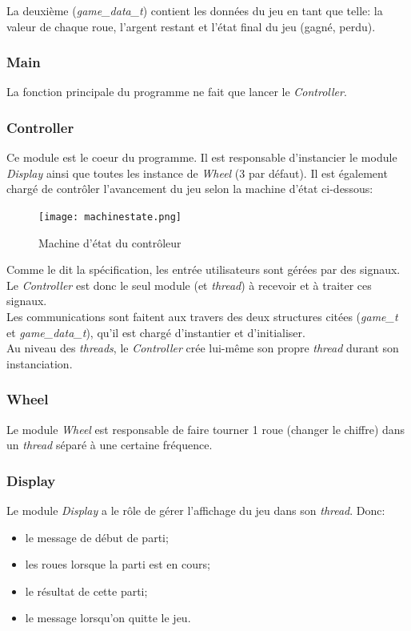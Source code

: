 \documentclass[11pt, a4paper]{article}
\begin{document}
La deuxième (\textit{game\_data\_t}) contient les données du jeu en tant que telle:
la valeur de chaque roue, l'argent restant et l'état final du jeu (gagné, perdu).

\subsubsection{Main}
La fonction principale du programme ne fait que lancer le \textit{Controller}.

\newpage

\subsubsection{Controller}
Ce module est le coeur du programme.
Il est responsable d'instancier le module \textit{Display} ainsi que toutes les instance de \textit{Wheel} (3 par défaut).
Il est également chargé de contrôler l'avancement du jeu selon la machine d'état ci-dessous:

\begin{figure}[H]
    \begin{center}
        \texttt{[image: machinestate.png]}
    \end{center}
    \caption{Machine d'état du contrôleur}
    \label{Machine d'état du contrôleur}
\end{figure}

Comme le dit la spécification, les entrée utilisateurs sont gérées par des signaux.
Le \textit{Controller} est donc le seul module (et \textit{thread}) à recevoir et à traiter ces signaux. \\

Les communications sont faitent aux travers des deux structures citées (\textit{game\_t} et \textit{game\_data\_t}),
qu'il est chargé d'instantier et d'initialiser. \\

Au niveau des \textit{threads}, le \textit{Controller} crée lui-même son propre \textit{thread} durant son instanciation.

\subsubsection{Wheel}
Le module \textit{Wheel} est responsable de faire tourner 1 roue (changer le chiffre) dans un \textit{thread} séparé à une certaine fréquence.

\subsubsection{Display}
Le module \textit{Display} a le rôle de gérer l'affichage du jeu dans son \textit{thread}. Donc:
\begin{itemize}
    \item le message de début de parti;
    \item les roues lorsque la parti est en cours;
    \item le résultat de cette parti;
    \item le message lorsqu'on quitte le jeu.
\end{itemize}
\end{document}
